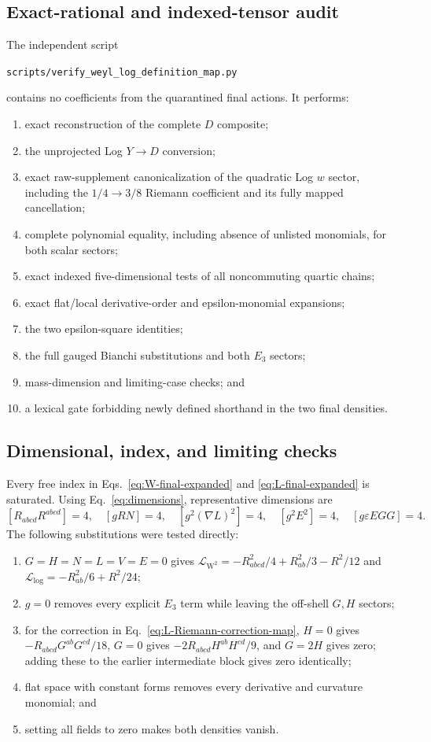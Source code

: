\documentclass[11pt]{article}
\newcommand{\cL}{\mathcal L}
\newcommand{\eps}{\varepsilon}
\newcommand{\Weyl}{\mathrm W}
\newcommand{\Log}{\log}
\begin{document}
\subsection{Exact-rational and indexed-tensor audit}

The independent script
\begin{center}
\texttt{scripts/verify\_weyl\_log\_definition\_map.py}
\end{center}
contains no coefficients from the quarantined final actions.  It performs:
\begin{enumerate}
\item exact reconstruction of the complete $D$ composite;
\item the unprojected Log $Y\to D$ conversion;
\item exact raw-supplement canonicalization of the quadratic Log $w$ sector,
including the $1/4\to3/8$ Riemann coefficient and its fully mapped
cancellation;
\item complete polynomial equality, including absence of unlisted monomials,
for both scalar sectors;
\item exact indexed five-dimensional tests of all noncommuting quartic chains;
\item exact flat/local derivative-order and epsilon-monomial expansions;
\item the two epsilon-square identities;
\item the full gauged Bianchi substitutions and both $E_3$ sectors;
\item mass-dimension and limiting-case checks; and
\item a lexical gate forbidding newly defined shorthand in the two final
densities.
\end{enumerate}

\subsection{Dimensional, index, and limiting checks}

Every free index in Eqs.~\eqref{eq:W-final-expanded} and
\eqref{eq:L-final-expanded} is saturated.  Using Eq.~\eqref{eq:dimensions},
representative dimensions are
\[
[R_{abcd}R^{abcd}]=4,\quad[gRN]=4,\quad
[g^2(\nabla L)^2]=4,\quad[g^2E^2]=4,
\quad[g\eps EGG]=4.
\]
The following substitutions were tested directly:
\begin{enumerate}
\item $G=H=N=L=V=E=0$ gives
$\cL_{\Weyl^2}=-R_{abcd}^2/4+R_{ab}^2/3-R^2/12$ and
$\cL_{\Log}=-R_{ab}^2/6+R^2/24$;
\item $g=0$ removes every explicit $E_3$ term while leaving the off-shell
$G,H$ sectors;
\item for the correction in Eq.~\eqref{eq:L-Riemann-correction-map}, $H=0$ gives
$-R_{abcd}G^{ab}G^{cd}/18$, $G=0$ gives
$-2R_{abcd}H^{ab}H^{cd}/9$, and $G=2H$ gives zero; adding these to the
earlier intermediate block gives zero identically;
\item flat space with constant forms removes every derivative and curvature
monomial; and
\item setting all fields to zero makes both densities vanish.
\end{enumerate}
\end{document}
